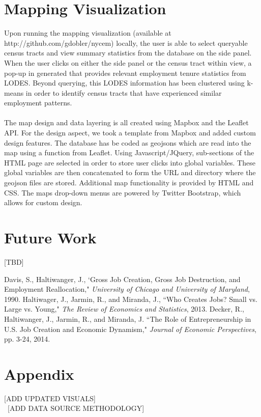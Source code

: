 \documentclass[article, 11pt]{article} %
\begin{document}
\section*{Mapping Visualization}

Upon running the mapping visualization (available at http://github.com/gdobler/nycem) locally, the user is able to select queryable census tracts and view summary statistics from the database on the side panel. When the user clicks on either the side panel or the census tract within view, a pop-up in generated that provides relevant employment tenure statistics from LODES. Beyond querying, this LODES information has been clustered using k-means in order to identify census tracts that have experienced similar employment patterns.
\\\\
The map design and data layering is all created using Mapbox and the Leaflet API. For the design aspect, we took a template from Mapbox and added custom design features. The database has be coded as geojsons which are read into the map using a function from Leaflet. Using Javascript/JQuery, sub-sections of the HTML page are selected in order to store user clicks into global variables. These global variables are then concatenated to form the URL and directory where the geojson files are stored. Additional map functionality is provided by HTML and CSS. The maps drop-down menus are powered by Twitter Bootstrap, which allows for custom design.


\section*{Future Work}

[TBD]



\begin{thebibliography}{100}
 Davis, S., Haltiwanger, J., `Gross Job Creation, Gross Job Destruction, and Employment Reallocation," \emph{University of Chicago and University of Maryland}, 1990.
 Haltiwager, J., Jarmin, R., and Miranda, J., ``Who Creates Jobs? Small vs. Large vs. Young," \emph{The Review of Economics and Statistics}, 2013.
 Decker, R., Haltiwanger, J., Jarmin, R., and Miranda, J. ``The Role of Entrepreneurship in U.S. Job Creation and Economic Dynamism," \emph{Journal of Economic Perspectives}, pp. 3-24, 2014.
\end{thebibliography}


\section*{Appendix}

[ADD UPDATED VISUALS]
\\\
[ADD DATA SOURCE METHODOLOGY] 

\end{document}
